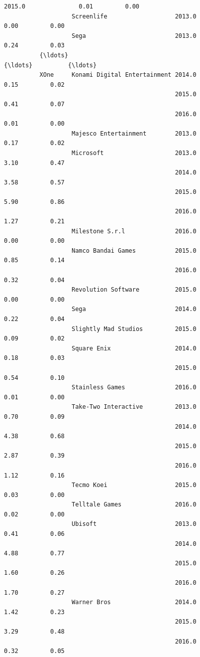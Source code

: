 \documentclass[11pt]{article}
\begin{document}
\begin{Verbatim}[commandchars=\\\{\}]
                                                2015.0               0.01         0.00   
                   Screenlife                   2013.0               0.00         0.00   
                   Sega                         2013.0               0.24         0.03   
          {\ldots}                                                         {\ldots}          {\ldots}   
          XOne     Konami Digital Entertainment 2014.0               0.15         0.02   
                                                2015.0               0.41         0.07   
                                                2016.0               0.01         0.00   
                   Majesco Entertainment        2013.0               0.17         0.02   
                   Microsoft                    2013.0               3.10         0.47   
                                                2014.0               3.58         0.57   
                                                2015.0               5.90         0.86   
                                                2016.0               1.27         0.21   
                   Milestone S.r.l              2016.0               0.00         0.00   
                   Namco Bandai Games           2015.0               0.85         0.14   
                                                2016.0               0.32         0.04   
                   Revolution Software          2015.0               0.00         0.00   
                   Sega                         2014.0               0.22         0.04   
                   Slightly Mad Studios         2015.0               0.09         0.02   
                   Square Enix                  2014.0               0.18         0.03   
                                                2015.0               0.54         0.10   
                   Stainless Games              2016.0               0.01         0.00   
                   Take-Two Interactive         2013.0               0.70         0.09   
                                                2014.0               4.38         0.68   
                                                2015.0               2.87         0.39   
                                                2016.0               1.12         0.16   
                   Tecmo Koei                   2015.0               0.03         0.00   
                   Telltale Games               2016.0               0.02         0.00   
                   Ubisoft                      2013.0               0.41         0.06   
                                                2014.0               4.88         0.77   
                                                2015.0               1.60         0.26   
                                                2016.0               1.70         0.27   
                   Warner Bros                  2014.0               1.42         0.23   
                                                2015.0               3.29         0.48   
                                                2016.0               0.32         0.05   
          

\end{Verbatim}
\end{document}
